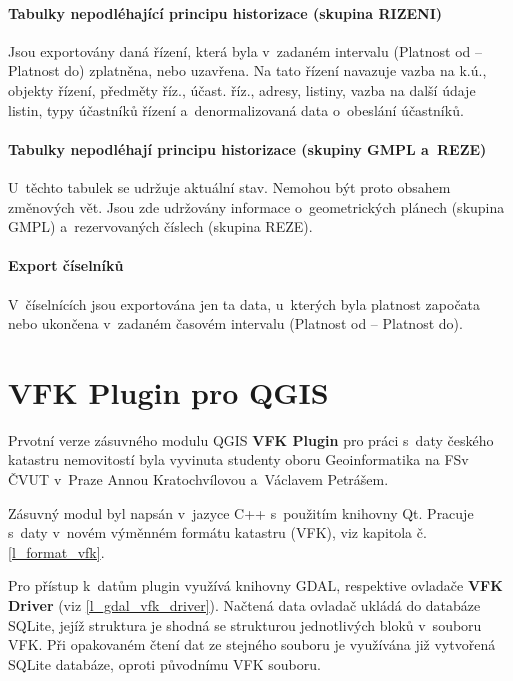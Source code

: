 \documentclass[a4paper,12pt,oneside]{book}
\begin{document}
\subsubsection{Tabulky nepodléhající principu historizace (skupina RIZENI)}

Jsou exportovány daná řízení, která byla v~zadaném intervalu (Platnost
od -- Platnost do) zplatněna, nebo uzavřena. Na tato řízení navazuje
vazba na k.ú., objekty řízení, předměty říz., účast. říz., adresy,
listiny, vazba na další údaje listin, typy účastníků řízení
a~denormalizovaná data o~obeslání účastníků.

\subsubsection{Tabulky nepodléhají principu historizace (skupiny GMPL a~REZE)}

U~těchto tabulek se udržuje aktuální stav. Nemohou být proto obsahem
změnových vět. Jsou zde udržovány informace o~geometrických plánech
(skupina GMPL) a~rezervovaných číslech (skupina
REZE).

\subsubsection{Export číselníků}

V~číselnících jsou exportována jen ta data, u~kterých byla platnost
započata nebo ukončena v~zadaném časovém intervalu (Platnost od --
Platnost do).


\clearpage
\chapter{VFK Plugin pro QGIS}
Prvotní verze zásuvného modulu QGIS \textbf{VFK Plugin} pro práci
s~daty českého katastru nemovitostí byla vyvinuta studenty oboru
Geoinformatika na FSv ČVUT v~Praze Annou Kratochvílovou a~Václavem
Petrášem.

Zásuvný modul byl napsán v~jazyce C++ s~použitím knihovny Qt. Pracuje
s~daty v~novém výměnném formátu katastru (VFK), viz kapitola
č. \ref{l_format_vfk}.

Pro přístup k~datům plugin využívá knihovny GDAL, respektive ovladače
\textbf{VFK Driver} (viz \ref{l_gdal_vfk_driver}). Načtená data ovladač ukládá do databáze SQLite,
jejíž struktura je shodná se strukturou jednotlivých bloků v~souboru
VFK. Při opakovaném čtení dat ze stejného souboru je využívána již
vytvořená SQLite databáze, oproti původnímu VFK souboru.
\end{document}
